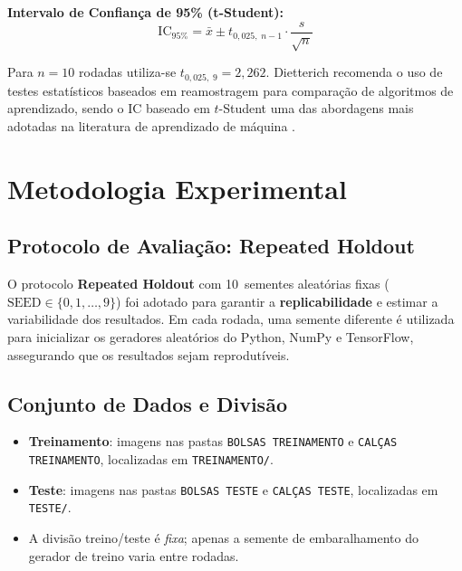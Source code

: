 \documentclass[12pt,a4paper]{article}
\begin{document}
\textbf{Intervalo de Confiança de 95\% (t-Student):}
\begin{equation}
  \mathrm{IC}_{95\%} = \bar{x} \pm t_{0{,}025,\;n-1}\cdot\frac{s}{\sqrt{n}}
  \label{eq:ic95_fund}
\end{equation}

Para $n = 10$ rodadas utiliza-se $t_{0{,}025,\;9} = 2{,}262$.
Dietterich \cite{dietterich1998approximate} recomenda o uso de testes
estatísticos baseados em reamostragem para comparação de algoritmos de
aprendizado, sendo o IC baseado em $t$-Student uma das abordagens mais
adotadas na literatura de aprendizado de máquina \cite{bouckaert2004evaluating}.

\section{Metodologia Experimental}

\subsection{Protocolo de Avaliação: Repeated Holdout}

O protocolo \textbf{Repeated Holdout} com 10~sementes aleatórias fixas
($\text{SEED} \in \{0, 1, \ldots, 9\}$) foi adotado para garantir a
\textbf{replicabilidade} e estimar a variabilidade dos resultados.
Em cada rodada, uma semente diferente é utilizada para inicializar
os geradores aleatórios do Python, NumPy e TensorFlow, assegurando
que os resultados sejam reprodutíveis.

\subsection{Conjunto de Dados e Divisão}

\begin{itemize}
  \item \textbf{Treinamento}: imagens nas pastas \texttt{BOLSAS TREINAMENTO} e
        \texttt{CALÇAS TREINAMENTO}, localizadas em \texttt{TREINAMENTO/}.
  \item \textbf{Teste}: imagens nas pastas \texttt{BOLSAS TESTE} e
        \texttt{CALÇAS TESTE}, localizadas em \texttt{TESTE/}.
  \item A divisão treino/teste é \emph{fixa}; apenas a semente de embaralhamento
        do gerador de treino varia entre rodadas.
\end{itemize}
\end{document}
